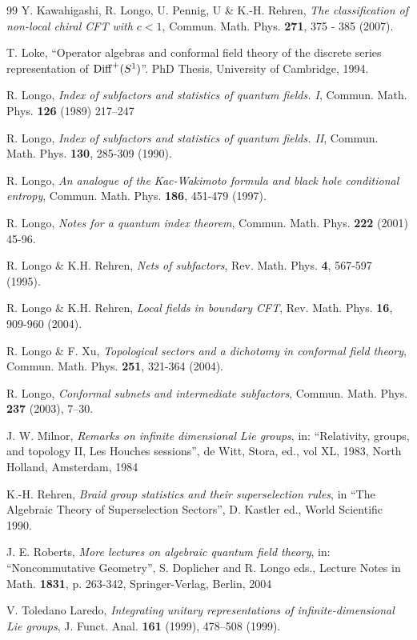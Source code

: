 \documentclass[11pt]{article}
\begin{document}
{{\begin{thebibliography}{99}
 Y. Kawahigashi, R. Longo, U. Pennig, U \&  K.-H. Rehren, 
{\it The classification of non-local chiral CFT with $c<1$},  
Commun. Math. Phys. {\bf 271},  375 - 385 (2007).

 T. Loke, ``Operator algebras and conformal field theory
of the discrete series representation of ${\rm Diff}^+(S^1)$''. PhD 
Thesis, University of Cambridge, 1994.

 R. Longo, 
{\it Index of subfactors and statistics of 
quantum fields. I}, Commun. Math. Phys. {\bf 126} (1989) 217--247 

 R. Longo, 
{\it Index of subfactors and statistics of quantum fields. II}, 
Commun. Math. Phys. {\bf 130}, 285-309 (1990).

 R. Longo, 
{\it An analogue of the Kac-Wakimoto formula and black hole conditional entropy}, Commun. Math. Phys. {\bf 186}, 451-479 (1997).

 R. Longo, 
{\it Notes for a quantum index theorem}, 
Commun. Math. Phys. {\bf 222} (2001) 45-96.

  R. Longo \&  K.H. Rehren,
{\it Nets of subfactors}, Rev. Math. Phys. {\bf 4}, 567-597 (1995).

  R. Longo \&  K.H. Rehren,
{\it Local fields in boundary CFT}, Rev. Math. Phys. {\bf 16}, 909-960 (2004).

 R. Longo \& F. Xu,
{\it Topological sectors and a dichotomy in conformal field theory}, 
 Commun. Math. Phys. {\bf 251}, 321-364 (2004).

 R. Longo, 
{\it Conformal subnets and intermediate subfactors}, Commun. Math. Phys. {\bf 237} (2003), 7--30.

 J. W. Milnor, 
{\it Remarks on infinite dimensional Lie groups}, in: ``Relativity, groups, and topology II, Les Houches sessions'', de Witt,  Stora, ed., vol XL, 1983, North Holland, Amsterdam, 1984

 K.-H. Rehren, 
{\it Braid group statistics and their superselection rules},
in ``The Algebraic Theory of Superselection Sectors'', D. Kastler ed., World Scientific 1990.

 J. E. Roberts,
{\it More lectures on algebraic quantum field theory}, in: ``Noncommutative Geometry'', S. Doplicher and R. Longo eds., Lecture Notes in Math. {\bf 1831}, p. 263-342, Springer-Verlag, Berlin, 2004

 V. Toledano Laredo, {\it Integrating unitary 
representations of infinite-dimensional Lie groups},
J. Funct. Anal. {\bf 161} (1999), 478--508 (1999).


\end{thebibliography}}}
\end{document}
